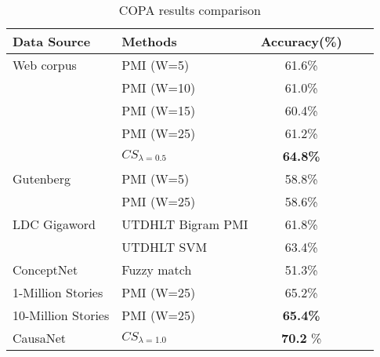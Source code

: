 
\begin{table}[th]
\small
\centering
\caption{COPA results comparison}
\label{tab:evaluation}
\begin{tabular}{llccc}
\hline
Data Source & Methods & Accuracy(\%) \\
\hline
Web corpus & PMI (W=5) & 61.6\% \\
& PMI (W=10) & 61.0\% \\
& PMI (W=15) & 60.4\% \\
& PMI (W=25) & 61.2\% \\
& {\bf $CS_{\lambda=0.5}$} & {\bf 64.8\%} \\
\hline
Gutenberg & PMI (W=5)  & 58.8\% \\
& PMI (W=25) & 58.6\% \\
\hline
LDC Gigaword & UTDHLT Bigram PMI & 61.8\% \\
 & UTDHLT SVM & 63.4\% \\
\hline
ConceptNet & Fuzzy match & 51.3\% \\
\hline
1-Million Stories & PMI (W=25) & 65.2\% \\
10-Million Stories & PMI (W=25) & {\bf 65.4\%} \\ \hline
CausaNet & {\bf $CS_{\lambda = 1.0}$ } & {\bf 70.2} \%  \\
\hline
\end{tabular}
\end{table}




